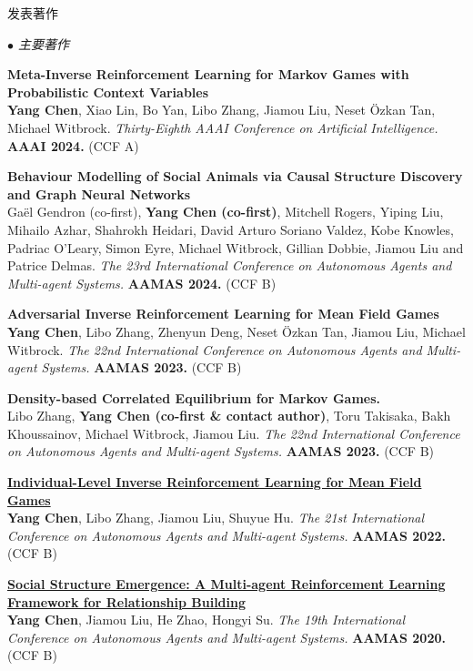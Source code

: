 \documentclass{resume} %
\begin{document}
\begin{rSection}{发表著作}
\begin{rSubsection}{\large\em $\bullet$ 主要著作}{}{}{}
	\item {\bf Meta-Inverse Reinforcement Learning for Markov Games with Probabilistic Context Variables}\\
		\textbf{Yang Chen}, Xiao Lin, Bo Yan, Libo Zhang, Jiamou Liu, Neset \"{O}zkan Tan, Michael Witbrock. {\em Thirty-Eighth AAAI Conference on Artificial Intelligence.} \textbf{AAAI 2024.} (CCF A)\\
	\item {\bf Behaviour Modelling of Social Animals via Causal Structure Discovery and Graph Neural Networks}\\
		Ga\"el Gendron (co-first), \textbf{Yang Chen (co-first)}, Mitchell Rogers, Yiping Liu, Mihailo Azhar, Shahrokh Heidari, David Arturo Soriano Valdez, Kobe Knowles, Padriac O'Leary, Simon Eyre, Michael Witbrock, Gillian Dobbie, Jiamou Liu and Patrice Delmas. {\em  The 23rd International Conference on Autonomous Agents and Multi-agent Systems.} \textbf{AAMAS 2024.} (CCF B)\\
	\item {\bf Adversarial Inverse Reinforcement Learning for Mean Field Games}\\
		\textbf{Yang Chen}, Libo Zhang, Zhenyun Deng, Neset \"{O}zkan Tan, Jiamou Liu, Michael Witbrock. {\em The 22nd International Conference on Autonomous Agents and Multi-agent Systems.} \textbf{AAMAS 2023.} (CCF B)\\
	\item {\bf Density-based Correlated Equilibrium for Markov Games.}\\
		Libo Zhang, \textbf{Yang Chen (co-first \& contact author)}, Toru Takisaka, Bakh Khoussainov, Michael Witbrock, Jiamou Liu. {\em The 22nd International Conference on Autonomous Agents and Multi-agent Systems.} \textbf{AAMAS 2023.} (CCF B)\\
	\item {\href{https://ifaamas.org/Proceedings/aamas2022/pdfs/p253.pdf}{\bf Individual-Level Inverse Reinforcement Learning for Mean Field Games}}\\
		\textbf{Yang Chen}, Libo Zhang, Jiamou Liu, Shuyue Hu. {\em The 21st International Conference on Autonomous Agents and Multi-agent Systems.} \textbf{AAMAS 2022.} (CCF B)\\
	\item {\href{http://www.ifaamas.org/Proceedings/aamas2020/pdfs/p1807.pdf}{\bf Social Structure Emergence: A Multi-agent Reinforcement Learning Framework for Relationship Building}}\\ 
		\textbf{Yang Chen}, Jiamou Liu, He Zhao, Hongyi Su. {\em The 19th International Conference on Autonomous Agents and Multi-agent Systems.} \textbf{AAMAS 2020.} (CCF B) \\
\end{rSubsection}


\end{rSection}
\end{document}
